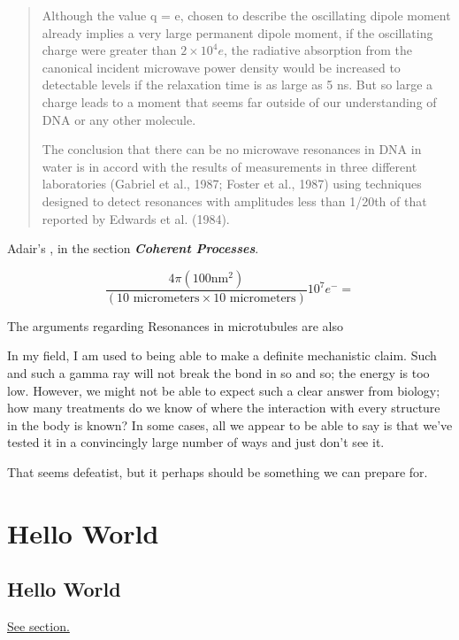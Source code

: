\documentclass[paper.tex]{subfiles}
\begin{document}
\cite{Vibrational2002}
\begin{quote}
Although the value q = e, chosen to describe the oscillating dipole moment already implies a very large permanent dipole moment, if the oscillating charge were greater
than $2\times 10^4 e$, the radiative absorption from the canonical
incident microwave power density would be increased to
detectable levels if the relaxation time is as large as 5 ns.
But so large a charge leads to a moment that seems far
outside of our understanding of DNA or any other molecule.


The conclusion that there can be no microwave resonances in DNA in water is in accord with the results of
measurements in three different laboratories (Gabriel et al.,
1987; Foster et al., 1987) using techniques designed to
detect resonances with amplitudes less than 1/20th of that
reported by Edwards et al. (1984).
\end{quote}

Adair's \cite{Vibrational2002}, in the section {\it \bf Coherent Processes}. 

$$\frac{4 \pi (100 \text{nm}^2)}{(10 \text{ micrometers} \times 10 \text{ micrometers})} 10^7 e^- = $$

The arguments regarding Resonances in microtubules are also 




In my field, I am used to being able to make a definite mechanistic claim. Such and such a gamma ray will not break the bond in so and so; the energy is too low. However, we might not be able to expect such a clear answer from biology; how many treatments do we know of where the interaction with every structure in the body is known? In some cases, all we appear to be able to say is that we've tested it in a convincingly large number of ways and just don't see it.

That seems defeatist, but it perhaps should be something we can prepare for.


\cite{Identification2018}



\section{Hello World}
\subsection{Hello World}
\label{sec:hello}


\hyperref[sec:hello]{See section.}
\end{document}
